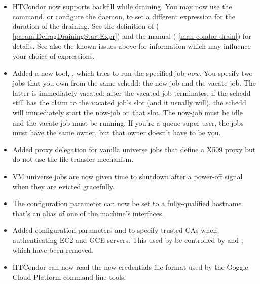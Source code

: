 \begin{itemize}

\item HTCondor now supports backfill while draining.  You may now use the
 command, or configure the  daemon, to set a
different  expression for the duration of the draining.  See
the definition of  (
\ref{param:DefragDrainingStartExpr}) and the  manual (
\ref{man-condor-drain}) for details.  See also the known issues above for
information which may influence your choice of  expressions.

\item Added a new tool, , which tries to run the specified job
\emph{now}.  You specify two jobs that you own from the same schedd: the
now-job and the vacate-job.  The latter is immediately vacated; after the
vacated job terminates, if the schedd still has the claim to the vacated job's
slot (and it usually will), the schedd will immediately start the now-job on
that slot.  The now-job must be idle and the vacate-job must be running.  If
you're a queue super-user, the jobs must have the same owner, but that owner
doesn't have to be you.

\item Added proxy delegation for vanilla universe jobs that define a X509 proxy
but do not use the file transfer mechanism.

\item VM universe jobs are now given time to shutdown after a power-off
signal when they are evicted gracefully.

\item The  configuration parameter can now be
set to a fully-qualified hostname that's an alias of one of the machine's
interfaces.

\item Added configuration parameters  and
 to specify trusted CAs when authenticating
EC2 and GCE servers.
This used by be controlled by  and
, which have been removed.

\item HTCondor can now read the new credentials file format used by
the Goggle Cloud Platform command-line tools.

\end{itemize}

